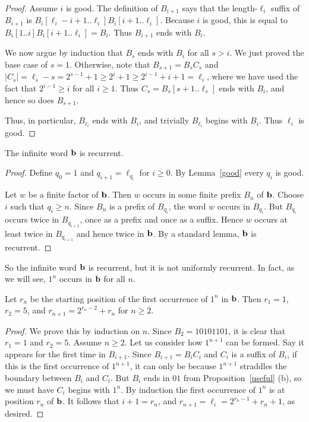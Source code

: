 \documentclass[12pt,reqno]{article}
\begin{document}
\begin{proof}
Assume $i$ is good.  The definition of $B_{i+1}$ 
says that the length-$\ell_i$ suffix of $B_{i+1}$ is
$B_i[\ell_i - i + 1.. \ell_i] B_i[i+1..\ell_i]$.
Because $i$ is good, this is equal to
$B_i[1..i]B_i[i+1..\ell_i] = B_i$.  Thus $B_{i+1}$ ends with $B_i$.

We now argue by induction that $B_s$ ends with $B_i$ for all $s> i$.
We just proved the base case of $s=1$.
Otherwise, note that
$B_{s+1} = B_s C_s$ and
$|C_s| = \ell_s - s = 2^{s-1} + 1 \geq 2^i + 1 \geq 2^{i-1} + i+1 = \ell_i$,
where we have used the fact that $2^{i-1} \geq i$ for all $i\geq 1 $.
Thus $C_s = B_s[s+1..\ell_s]$ ends with $B_i$, and hence so does $B_{s+1}$.

Thus, in particular, $B_{\ell_i}$ ends with $B_i$, and trivially
$B_{\ell_i}$ begins with $B_i$.  Thus $\ell_i$ is good.
\end{proof}

\begin{theorem}
The infinite word $\bf b$ is recurrent.
\label{recur}
\end{theorem}

\begin{proof}
Define $q_0 = 1$ and $q_{i+1} = \ell_{q_i}$ for $i \geq 0$.
By Lemma~\ref{good} every $q_i$ is good.

Let $w$ be a finite factor of $\bf b$.   Then $w$ occurs in some finite
prefix $B_n$ of $\bf b$.  Choose $i$ such that $q_i \geq n$.  
Since $B_n$ is a prefix of $B_{q_i}$, the word $w$ occurs in $B_{q_i}$.
But $B_{q_i}$ occurs twice in $B_{q_{i+1}}$, once as a prefix and once
as a suffix.  Hence $w$ occurs at least twice in $B_{q_{i+1}}$ and hence
twice in $\bf b$.  By a standard lemma, $\bf b$ is recurrent.
\end{proof}

So the infinite word $\bf b$ is recurrent,
but it is not uniformly recurrent.  In fact, as
we will see, $1^n$ occurs in $\bf b$ for all $n$. 

\begin{theorem}
Let $r_n$ be the starting position of the first occurrence of
$1^n$ in $\bf b$.  Then
$r_1 = 1$, $r_2 = 5$, and $r_{n+1} = 2^{r_n - 2} + r_n$ for
$n \geq 2$.   
\end{theorem}


\begin{proof}
We prove this by induction on $n$.  Since $B_2 = 10101101$,
it is clear that $r_1 = 1$ and $r_2 = 5$.  Assume $n \geq 2$.
Let us consider how $1^{n+1}$ can be formed.  Say it appears for the first
time in $B_{i+1}$.  Since
$B_{i+1} = B_i C_i$ and $C_i$ is a suffix
of $B_i$, if this is the first occurrence of $1^{n+1}$, it can only
be because $1^{n+1}$ straddles the boundary between $B_i$ and
$C_i$.  
But $B_i$ ends in $01$ from Proposition~\ref{useful} (b),
so we must have $C_i$ begins with $1^n$.  By induction
the first occurrence of $1^n$ is at position $r_n$ of $\bf b$.
It follows that $i+1 = r_n$, and 
$r_{n+1} = \ell_i = 2^{r_n - 1} + r_n + 1$, as desired.
\end{proof}
\end{document}
